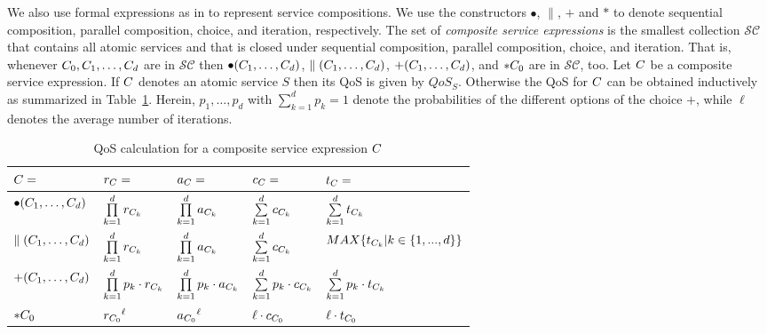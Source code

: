 We also use formal expressions as in \cite{ma2012formal} to represent service compositions. We use the constructors $\bullet$, $\parallel$, $+$ and $\ast$ to denote sequential composition, parallel composition, choice, and iteration, respectively. The set of \emph{composite service expressions} is the smallest collection $\mathcal{SC}$ that contains all atomic services and that is closed under sequential composition, parallel composition, choice, and iteration. That is, whenever $C_0,C_1,\ldots,C_d$ are in $\mathcal{SC}$ then $\bullet(C_1,\ldots,C_d)$, $\parallel(C_1,\ldots,C_d)$, $+(C_1,\ldots,C_d)$, and $\ast C_0$ are in $\mathcal{SC}$, too. Let $C$ be a composite service expression. If $C$ denotes an atomic service $S$ then its QoS is given by $QoS_S$.  Otherwise the QoS for $C$ can be obtained inductively as summarized in Table~\ref{tbl:QoS_Aggre}. Herein, $p_1,\ldots,p_d$ with $\sum\limits^d_{k=1}p_k=1$ denote the probabilities of the different options of the choice $+$, while $\ell$ denotes the average number of iterations.

\begin{table}[htb]
\centering
\caption{QoS calculation for a composite service expression $C$}
\begin{tabular}{l|l|l|l|l}
\hline
 $C=$       &$r_C=$                              &$a_C=$                              &$c_C=$                            &$t_C=$ \\ \hline
 $\bullet(C_1,\ldots,C_d)$      &$\prod\limits^d_{k=1}r_{C_k}$    &$\prod\limits^d_{k=1}a_{C_k}$    &$\sum\limits^d_{k=1}c_{C_k}$   &$\sum\limits^d_{k=1}t_{C_k}$  \\ \hline
 $\parallel(C_1,\ldots,C_d)$  &$\prod\limits^d_{k=1}r_{C_k}$    &$\prod\limits^d_{k=1}a_{C_k}$    &$\sum\limits^d_{k=1}c_{C_k}$   &$MAX \{ t_{C_k} | k \in \{ 1,...,d \} \}$\\ \hline
 $+(C_1,\ldots,C_d)$     &$\prod\limits^d_{k=1}p_k\cdot r_{C_k}$    &$\prod\limits^d_{k=1}p_k\cdot a_{C_k}$    &$\sum\limits^d_{k=1}p_k\cdot c_{C_k}$   &$\sum\limits^d_{k=1}p_k\cdot t_{C_k}$  \\ \hline
 $\ast C_0$         &${r_{C_0}}^\ell$  &${a_{C_0}}^\ell$  &$\ell\cdot c_{C_0}$ &$\ell\cdot t_{C_0}$ \\ \hline
\end{tabular}
\label{tbl:QoS_Aggre}
\end{table}

